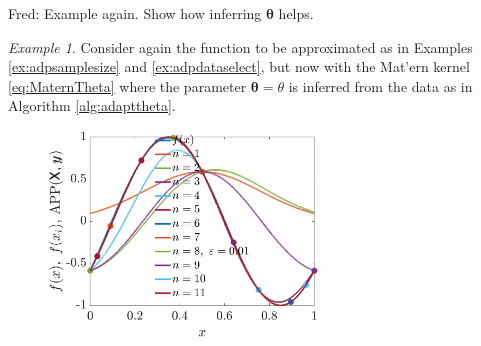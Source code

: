 \documentclass[]{mcom-l}
\theoremstyle{theorem}
\theoremstyle{remark}
\newtheorem{example}{Example}
\newcommand{\btheta}{{\boldsymbol{\theta}}}
\newcommand{\FredNote}[1]{{\color{blue}Fred: #1}}
\begin{document}
\FredNote{Example again. Show how inferring $\btheta$ helps.}

\begin{example}
	\label{ex:adpdatachooseth}
	Consider again the function to be approximated as in Examples \ref{ex:adpsamplesize} and \ref{ex:adpdataselect}, but now with the Mat'ern kernel \eqref{eq:MaternTheta} where the parameter $\btheta = \theta$ is inferred from the data as in Algorithm \ref{alg:adapttheta}.
		
	
	
	
	\begin{figure}[H]
		\centering
		\includegraphics[height = 5.5cm]{ProgramsImages/AdaptAlgo3_sinFun_GaussKernel_adapt_th_EmpBayesAx_theta_1.eps}
		\caption{ \label{fig:ex3}}
	\end{figure}
	
\end{example}


\end{document}
